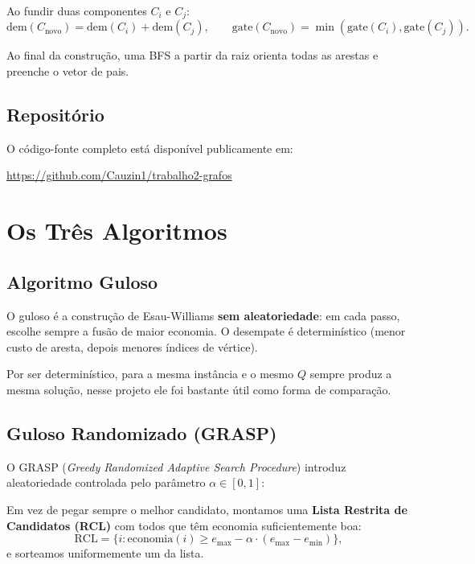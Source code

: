\documentclass[12pt, a4paper]{article}
\begin{document}
Ao fundir duas componentes $C_i$ e $C_j$:
\[
\text{dem}(C_\text{novo}) = \text{dem}(C_i) + \text{dem}(C_j), \qquad \text{gate}(C_\text{novo}) = \min(\text{gate}(C_i), \text{gate}(C_j)).
\]

Ao final da construção, uma BFS a partir da raiz orienta todas as arestas e preenche o vetor de pais.

\subsection{Repositório}

O código-fonte completo está disponível publicamente em:
\begin{center}
    \url{https://github.com/Cauzin1/trabalho2-grafos}
\end{center}

\section{Os Três Algoritmos}

\subsection{Algoritmo Guloso}

O guloso é a construção de Esau-Williams \textbf{sem aleatoriedade}: em cada passo, escolhe sempre a fusão de maior economia. O desempate é determinístico (menor custo de aresta, depois menores índices de vértice).

Por ser determinístico, para a mesma instância e o mesmo $Q$ sempre produz a mesma solução, nesse projeto ele foi bastante útil como forma de comparação.

\subsection{Guloso Randomizado (GRASP)}

O GRASP (\textit{Greedy Randomized Adaptive Search Procedure}) \cite{feo1995} introduz aleatoriedade controlada pelo parâmetro $\alpha \in [0,1]$:

Em vez de pegar sempre o melhor candidato, montamos uma \textbf{Lista Restrita de Candidatos (RCL)} com todos que têm economia suficientemente boa:
\[
\text{RCL} = \{ i : \text{economia}(i) \geq e_{\max} - \alpha \cdot (e_{\max} - e_{\min}) \},
\]
e sorteamos uniformemente um da lista.
\end{document}
